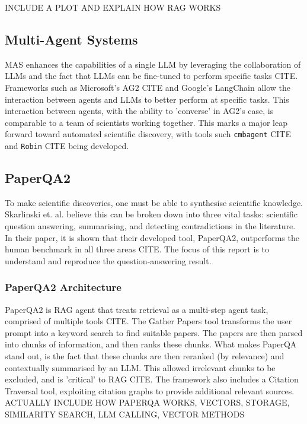INCLUDE A PLOT AND EXPLAIN HOW RAG WORKS

\subsection{Multi-Agent Systems}
MAS enhances the capabilities of a single LLM by leveraging the collaboration of LLMs and the fact that LLMs can be fine-tuned to perform specific tasks CITE. 
Frameworks such as Microsoft's AG2 CITE and Google's LangChain allow the interaction between agents and LLMs to better perform at specific tasks. 
This interaction between agents, with the ability to 'converse' in AG2's case, is comparable to a team of scientists working together. 
This marks a major leap forward toward automated scientific discovery, with tools such \texttt{cmbagent} CITE and \texttt{Robin} CITE being developed.\\

\subsection{PaperQA2}
To make scientific discoveries, one must be able to synthesise scientific knowledge.
Skarlinski et. al. believe this can be broken down into three vital tasks: scientific question answering, summarising, and detecting contradictions in the literature.
In their paper, it is shown that their developed tool, PaperQA2, outperforms the human benchmark in all three areas CITE. 
The focus of this report is to understand and reproduce the question-answering result. \\

\subsubsection{PaperQA2 Architecture}
PaperQA2 is RAG agent that treats retrieval as a multi-step agent task, comprised of multiple tools CITE. 
The Gather Papers tool transforms the user prompt into a keyword search to find suitable papers. 
The papers are then parsed into chunks of information, and then ranks these chunks. 
What makes PaperQA stand out, is the fact that these chunks are then reranked (by relevance) and contextually summarised by an LLM.
This allowed irrelevant chunks to be excluded, and is 'critical' to RAG CITE.
The framework also includes a Citation Traversal tool, exploiting citation graphs to provide additional relevant sources. \\

ACTUALLY INCLUDE HOW PAPERQA WORKS, VECTORS, STORAGE, SIMILARITY SEARCH, LLM CALLING, VECTOR METHODS


